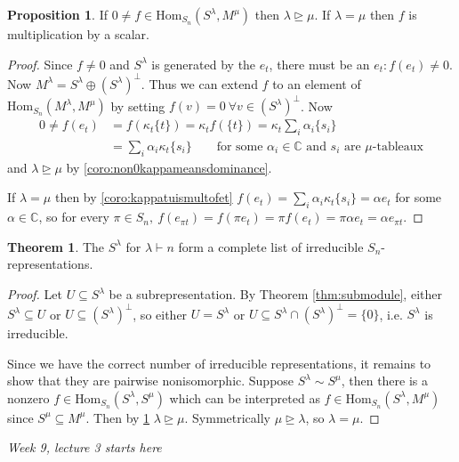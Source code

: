\documentclass[a4paper]{article}
\newcommand{\C}{\mathbb{C}}
\newcommand{\Hom}{\text{Hom}}
\theoremstyle{definition}
\newtheorem{prop}[defn]{Proposition}
\newtheorem{thm}[defn]{Theorem}
\begin{document}
\begin{prop}
\label{prop:non0homSlamMmumeansdom}
If $0\neq f\in \Hom_{S_n}(S^\lambda,M^\mu)$ then $\lambda\unrhd\mu$. If $\lambda=\mu$ then $f$ is multiplication by a scalar.
\end{prop}
\begin{proof}
Since $f\neq 0$ and $S^\lambda$ is generated by the $e_t$, there must be an $e_t:f(e_t)\neq 0$. Now $M^\lambda=S^\lambda\oplus(S^\lambda)^\perp$. Thus we can extend $f$ to an element of $\Hom_{S_n}(M^\lambda,M^\mu)$ by setting $f(v)=0 \ \forall v\in(S^\lambda)^\perp$. Now
\[
\begin{aligned}
0\neq f(e_t)&=f(\kappa_t\{t\})=\kappa_t f(\{t\})=\kappa_t\sum_i\alpha_i\{s_i\}\\
&=\sum_i\alpha_i\kappa_t\{s_i\} \qquad\text{for some }\alpha_i\in\C\text{ and }s_i\text{ are }\mu\text{-tableaux}
\end{aligned}
\]
and $\lambda\unrhd\mu$ by \ref{coro:non0kappameansdominance}.

If $\lambda=\mu$ then by \ref{coro:kappatuismultofet} $f(e_t)=\sum_i\alpha_i\kappa_t\{s_i\}=\alpha e_t$ for some $\alpha\in\C$, so for every $\pi\in S_n,\ f(e_{\pi t})=f(\pi e_t)=\pi f(e_t)=\pi\alpha e_t=\alpha e_{\pi t}$.
\end{proof}

\begin{thm}
The $S^\lambda$ for $\lambda\vdash n$ form a complete list of irreducible $S_n$-representations.
\end{thm}
\begin{proof}
Let $U\subseteq S^\lambda$ be a subrepresentation. By Theorem \ref{thm:submodule}, either $S^\lambda\subseteq U$ or $U\subseteq (S^\lambda)^\perp$, so either $U=S^\lambda$ or $U\subseteq S^\lambda\cap (S^\lambda)^\perp=\{0\}$, i.e. $S^\lambda$ is irreducible.

Since we have the correct number of irreducible representations, it remains to show that they are pairwise nonisomorphic. Suppose $S^\lambda\sim S^\mu$, then there is a nonzero $f\in\Hom_{S_n}(S^\lambda,S^\mu)$ which can be interpreted as $f\in\Hom_{S_n}(S^\lambda,M^\mu)$ since $S^\mu\subseteq M^\mu$. Then by \ref{prop:non0homSlamMmumeansdom} $\lambda\unrhd\mu$. Symmetrically $\mu\unrhd\lambda$, so $\lambda=\mu$.
\end{proof}

\begin{flushright}
\textit{Week 9, lecture 3 starts here}
\end{flushright}
\end{document}
